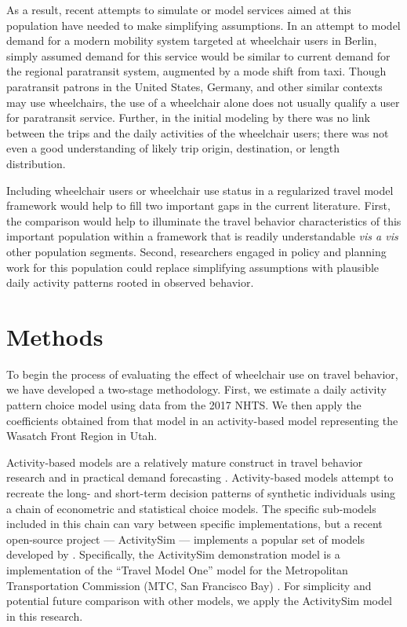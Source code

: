 \documentclass[3p, authoryear, review]{elsarticle} %
\begin{document}
As a result, recent attempts to simulate or model services aimed at this
population have needed to make simplifying assumptions. In an attempt to model
demand for a modern mobility system targeted at wheelchair users in Berlin,
\citet{Bischoff2019} simply assumed demand for this service would be similar to current
demand for the regional paratransit system, augmented by a mode shift from taxi.
Though paratransit patrons in the United States, Germany, and other similar
contexts may use wheelchairs, the use of a wheelchair alone does not usually
qualify a user for paratransit service.
Further, in the initial modeling by \citet{Bischoff2019} there was no link between the
trips and the daily activities of the wheelchair users; there was not even a
good understanding of likely trip origin, destination, or length distribution.

Including wheelchair users or wheelchair use status in a regularized travel model
framework would help to fill two important gaps in the current literature. First,
the comparison would help to illuminate the travel behavior characteristics of
this important population within a framework that is readily understandable
\emph{vis a vis} other population segments. Second, researchers engaged in
policy and planning work for this population could replace simplifying assumptions
with plausible daily activity patterns rooted in observed behavior.

\hypertarget{methodology}{%
\section{Methods}\label{methodology}}

To begin the process of evaluating the effect of wheelchair use on travel
behavior, we have developed a two-stage methodology. First, we
estimate a daily activity pattern choice model using data from the 2017 NHTS. We
then apply the coefficients obtained from that model in an activity-based model
representing the Wasatch Front Region in Utah.

Activity-based models are a relatively mature construct in travel behavior
research and in practical demand forecasting \citep{rasouli2014activity}. Activity-based models attempt
to recreate the long- and short-term decision patterns of synthetic individuals using a
chain of econometric and statistical choice models. The specific sub-models included
in this chain can vary between specific implementations, but a recent
open-source project --- ActivitySim \citep{activitysim} --- implements a popular
set of models developed by \citet{davidson2010ct}. Specifically, the ActivitySim demonstration
model is a implementation of the ``Travel Model One'' model for the Metropolitan
Transportation Commission (MTC, San Francisco Bay) \citep{erhardt2012mtc}.
For simplicity and potential future comparison with other models, we apply the
ActivitySim model in this research.
\end{document}
